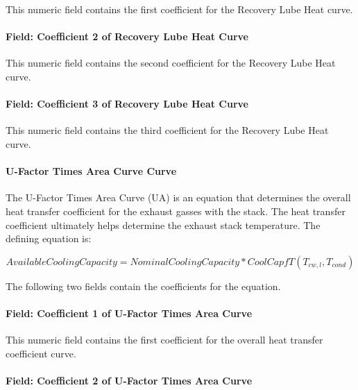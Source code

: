 This numeric field contains the first coefficient for the Recovery Lube Heat curve.

\paragraph{Field: Coefficient 2 of Recovery Lube Heat Curve}\label{field-coefficient-2-of-recovery-lube-heat-curve}

This numeric field contains the second coefficient for the Recovery Lube Heat curve.

\paragraph{Field: Coefficient 3 of Recovery Lube Heat Curve}\label{field-coefficient-3-of-recovery-lube-heat-curve}

This numeric field contains the third coefficient for the Recovery Lube Heat curve.

\paragraph{U-Factor Times Area Curve Curve}\label{u-factor-times-area-curve-curve}

The U-Factor Times Area Curve (UA) is an equation that determines the overall heat transfer coefficient for the exhaust gasses with the stack. The heat transfer coefficient ultimately helps determine the exhaust stack temperature. The defining equation is:

\begin{equation}
    AvailableCoolingCapacity = NominalCoolingCapacity*CoolCapfT\left( {{T_{cw,l}},{T_{cond}}} \right)
\end{equation}

The following two fields contain the coefficients for the equation.

\paragraph{Field: Coefficient 1 of U-Factor Times Area Curve}\label{field-coefficient-1-of-u-factor-times-area-curve-1-000}

This numeric field contains the first coefficient for the overall heat transfer coefficient curve.

\paragraph{Field: Coefficient 2 of U-Factor Times Area Curve}\label{field-coefficient-2-of-u-factor-times-area-curve-1-000}


